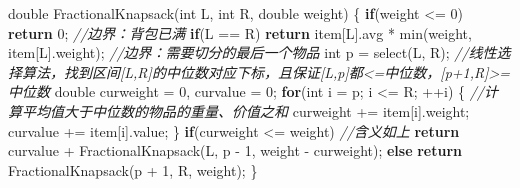 \documentclass{article}
\newenvironment{Shaded}{}{}
\newcommand{\CommentTok}[1]{\textcolor[rgb]{0.38,0.63,0.69}{\textit{#1}}}
\newcommand{\ControlFlowTok}[1]{\textcolor[rgb]{0.00,0.44,0.13}{\textbf{#1}}}
\newcommand{\DataTypeTok}[1]{\textcolor[rgb]{0.56,0.13,0.00}{#1}}
\newcommand{\DecValTok}[1]{\textcolor[rgb]{0.25,0.63,0.44}{#1}}
\newcommand{\NormalTok}[1]{#1}
\begin{document}
\begin{Shaded}
\begin{Highlighting}[]
\DataTypeTok{double}\NormalTok{ FractionalKnapsack(}\DataTypeTok{int}\NormalTok{ L, }\DataTypeTok{int}\NormalTok{ R, }\DataTypeTok{double}\NormalTok{ weight) \{}
    \ControlFlowTok{if}\NormalTok{(weight <= }\DecValTok{0}\NormalTok{) }\ControlFlowTok{return} \DecValTok{0}\NormalTok{; }\CommentTok{//边界：背包已满}
    \ControlFlowTok{if}\NormalTok{(L == R) }\ControlFlowTok{return}\NormalTok{ item[L].avg * min(weight, item[L].weight); }
    \CommentTok{//边界：需要切分的最后一个物品}
    \DataTypeTok{int}\NormalTok{ p = select(L, R); }
    \CommentTok{//线性选择算法，找到区间[L,R]的中位数对应下标，且保证[L,p]都<=中位数，[p+1,R]>=中位数}
    \DataTypeTok{double}\NormalTok{ curweight = }\DecValTok{0}\NormalTok{, curvalue = }\DecValTok{0}\NormalTok{;}
    \ControlFlowTok{for}\NormalTok{(}\DataTypeTok{int}\NormalTok{ i = p; i <= R; ++i) \{ }\CommentTok{//计算平均值大于中位数的物品的重量、价值之和}
\NormalTok{        curweight += item[i].weight;}
\NormalTok{        curvalue += item[i].value;}
\NormalTok{    \}}
    \ControlFlowTok{if}\NormalTok{(curweight <= weight) }\CommentTok{//含义如上}
        \ControlFlowTok{return}\NormalTok{ curvalue + FractionalKnapsack(L, p - }\DecValTok{1}\NormalTok{, weight - curweight);}
    \ControlFlowTok{else} 
        \ControlFlowTok{return}\NormalTok{ FractionalKnapsack(p + }\DecValTok{1}\NormalTok{, R, weight);}
\NormalTok{\}}
\end{Highlighting}
\end{Shaded}
\end{document}
